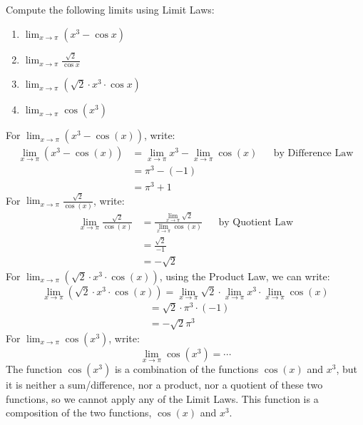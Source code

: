 \documentclass{ximera}
\begin{document}
\begin{example}
  Compute the following limits using Limit Laws:
  \begin{enumerate}
  \item\label{lle1a} $\lim_{x\to \pi} (x^3-\cos{x})$
  \item\label{lle1b} $\lim_{x\to \pi} \frac{\sqrt{2}}{\cos{x}}$
  \item\label{lle1c} $\lim_{x\to \pi} (\sqrt{2}\cdot x^3\cdot\cos{x})$
  \item\label{lle1d} $\lim_{x\to \pi} \cos({x^3})$
  \end{enumerate}
  \begin{explanation}
    For $\lim_{x\to \pi} (x^3-\cos(x))$, write:
    \begin{align*}
      \lim_{x\to \pi} (x^3-\cos(x))&=\lim_{x\to \pi} x^3-\lim_{x\to \pi}\cos(x) && \text{by Difference Law}\\
      &=\pi^3-(-1)\\
      &=\pi^3+1
    \end{align*}
    For $\lim_{x\to \pi} \frac{\sqrt{2}}{\cos(x)}$, write:
    \begin{align*}
      \lim_{x\to \pi} \frac{\sqrt{2}}{\cos(x)}&=\frac{\lim_{x\to \pi}\sqrt{2}}{\lim_{x\to \pi}\cos(x)} && \text{by Quotient Law}\\
      &=\frac{\sqrt{2}}{-1}\\
      &=-\sqrt{2}
    \end{align*}
    For $\lim_{x\to \pi} (\sqrt{2}\cdot x^3\cdot\cos(x))$, using the Product Law, we can write:
    \[
    \lim_{x\to \pi} (\sqrt{2}\cdot x^3\cdot\cos(x))=\lim_{x\to \pi} \sqrt{2}\cdot \lim_{x\to \pi}x^3\cdot \lim_{x\to \pi}\cos(x)
    \]
    \begin{align*}
      &=\sqrt{2}\cdot \pi^3\cdot(-1)\\
      &=-\sqrt{2}\pi^3
    \end{align*}
    For $\lim_{x\to \pi} \cos({x^3})$, write:
    \[
    \lim_{x\to \pi} \cos({x^3})= \cdots 
    \]
    The function $\cos({x^3})$ is a combination of the functions
    $\cos({x})$ and $x^3$, but it is neither a sum/difference, nor a
    product, nor a quotient of these two functions, so we cannot apply
    any of the Limit Laws. This function is a composition of the two
    functions, $\cos(x)$ and $x^3$.
  \end{explanation}
\end{example}
\end{document}

